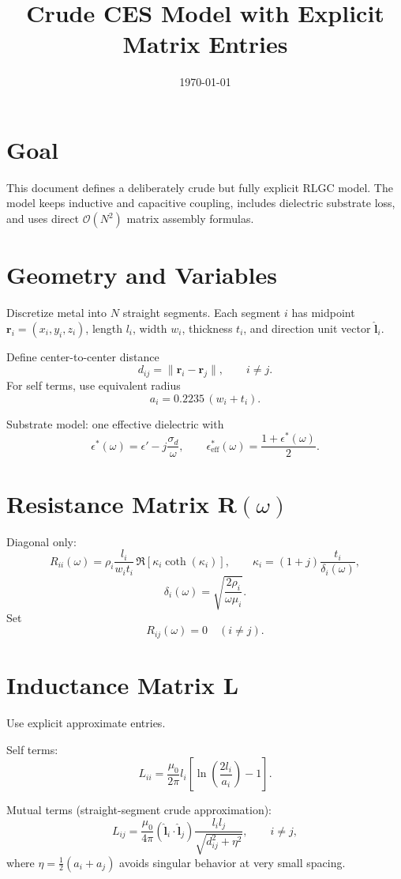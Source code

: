 \documentclass[11pt]{article}
\title{Crude CES Model with Explicit Matrix Entries}
\author{}
\date{\today}
\begin{document}
\maketitle

\section{Goal}
This document defines a deliberately crude but fully explicit RLGC model.
The model keeps inductive and capacitive coupling, includes dielectric substrate loss, and uses direct $\mathcal{O}(N^2)$ matrix assembly formulas.

\section{Geometry and Variables}
Discretize metal into $N$ straight segments.
Each segment $i$ has midpoint $\bm{r}_i=(x_i,y_i,z_i)$, length $l_i$, width $w_i$, thickness $t_i$, and direction unit vector $\hat{\bm{l}}_i$.

Define center-to-center distance
\[
d_{ij}=\|\bm{r}_i-\bm{r}_j\|,\qquad i\neq j.
\]
For self terms, use equivalent radius
\[
a_i=0.2235\,(w_i+t_i).
\]

Substrate model: one effective dielectric with
\[
\epsilon^*(\omega)=\epsilon'-j\frac{\sigma_d}{\omega},
\qquad
\epsilon_{\mathrm{eff}}^*(\omega)=\frac{1+\epsilon^*(\omega)}{2}.
\]

\section{Resistance Matrix $\bm{R}(\omega)$}
Diagonal only:
\[
R_{ii}(\omega)=\rho_i\frac{l_i}{w_i t_i}\,\Re\!\left[\kappa_i\coth(\kappa_i)\right],
\qquad
\kappa_i=(1+j)\frac{t_i}{\delta_i(\omega)},
\]
\[
\delta_i(\omega)=\sqrt{\frac{2\rho_i}{\omega\mu_i}}.
\]
Set
\[
R_{ij}(\omega)=0\quad (i\neq j).
\]

\section{Inductance Matrix $\bm{L}$}
Use explicit approximate entries.

Self terms:
\[
L_{ii}=\frac{\mu_0}{2\pi}l_i\left[\ln\!\left(\frac{2l_i}{a_i}\right)-1\right].
\]

Mutual terms (straight-segment crude approximation):
\[
L_{ij}=\frac{\mu_0}{4\pi}(\hat{\bm{l}}_i\cdot\hat{\bm{l}}_j)
\frac{l_i l_j}{\sqrt{d_{ij}^2+\eta^2}},
\qquad i\neq j,
\]
where $\eta=\tfrac12(a_i+a_j)$ avoids singular behavior at very small spacing.
\end{document}
